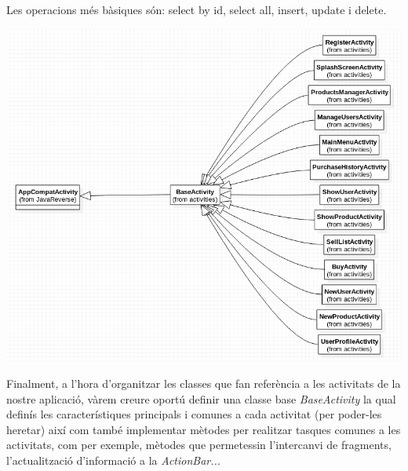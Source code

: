 \documentclass{article}[]
\begin{document}
Les operacions més bàsiques són: select by id, select all, insert, update i delete.
	\begin{center}
	\includegraphics[scale=0.5]{img/7.png}
\end{center}
	Finalment, a l'hora d'organitzar les classes que fan referència a les activitats de la nostre aplicació, vàrem creure oportú definir una classe base \textit{BaseActivity} la qual definís les característiques principals i comunes a cada activitat (per poder-les heretar) així com també implementar mètodes per realitzar tasques comunes a les activitats, com per exemple, mètodes que permetessin l'intercanvi de fragments, l'actualització d'informació a la \textit{ActionBar...}
	
\begin{center}
\end{center}
\newpage
\end{document}

